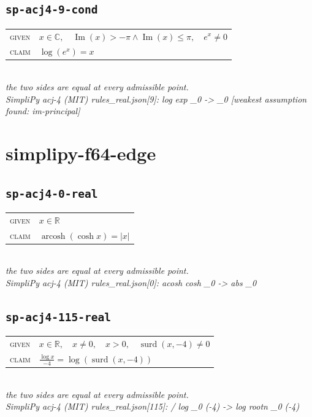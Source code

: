 \documentclass[11pt]{article}
\begin{document}
\subsection*{\texttt{sp-acj4-9-cond}}
\begin{tabular}{@{}l@{\quad}l@{}}
\textsc{given} & $x \in \mathbb{C},\quad \operatorname{Im}\left(x\right) > -\pi \land \operatorname{Im}\left(x\right) \le \pi,\quad e^{x} \neq 0$ \\[4pt]
\textsc{claim} & $\displaystyle \log\left(e^{x}\right) = x$ \\
\end{tabular}\\[2pt]
{\small\emph{the two sides are equal at every admissible point.}}\\
\emph{SimpliPy acj-4 (MIT) rules\_real.json[9]: log exp \_0  ->  \_0  [weakest assumption found: im-principal]}\\

\section*{simplipy-f64-edge}
\subsection*{\texttt{sp-acj4-0-real}}
\begin{tabular}{@{}l@{\quad}l@{}}
\textsc{given} & $x \in \mathbb{R}$ \\[4pt]
\textsc{claim} & $\displaystyle \operatorname{arcosh}\left(\cosh x\right) = \left|x\right|$ \\
\end{tabular}\\[2pt]
{\small\emph{the two sides are equal at every admissible point.}}\\
\emph{SimpliPy acj-4 (MIT) rules\_real.json[0]: acosh cosh \_0  ->  abs \_0}\\

\subsection*{\texttt{sp-acj4-115-real}}
\begin{tabular}{@{}l@{\quad}l@{}}
\textsc{given} & $x \in \mathbb{R},\quad x \neq 0,\quad x > 0,\quad \operatorname{surd}\left(x, -4\right) \neq 0$ \\[4pt]
\textsc{claim} & $\displaystyle \frac{\log x}{-4} = \log\left(\operatorname{surd}\left(x, -4\right)\right)$ \\
\end{tabular}\\[2pt]
{\small\emph{the two sides are equal at every admissible point.}}\\
\emph{SimpliPy acj-4 (MIT) rules\_real.json[115]: / log \_0 (-4)  ->  log rootn \_0 (-4)}\\
\end{document}
